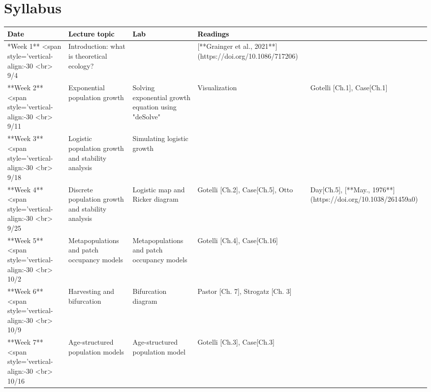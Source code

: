 \documentclass[
]{book}
\begin{document}
\hypertarget{syllabus}{%
\chapter*{Syllabus}\label{syllabus}}

\begingroup\fontsize{17}{19}\selectfont

\begin{tabu} to 
\hline
\begingroup\fontsize{20}{22}\selectfont \textcolor{black}{\textbf{Date}}\endgroup & \begingroup\fontsize{20}{22}\selectfont \textcolor{black}{\textbf{Lecture topic}}\endgroup & \begingroup\fontsize{20}{22}\selectfont \textcolor{black}{\textbf{Lab}}\endgroup & \begingroup\fontsize{20}{22}\selectfont \textcolor{black}{\textbf{Readings}}\endgroup\\
\hline
**Week 1** <span style='vertical-align:-30%
           <br> 9/4 & Introduction: what is theoretical ecology? & \- & [**Grainger et al., 2021**](https://doi.org/10.1086/717206)\\
\hline
**Week 2** <span style='vertical-align:-30%
           <br> 9/11 & Exponential population growth & Solving exponential growth equation using "deSolve" & Visualization & Gotelli [Ch.1], Case[Ch.1]\\
\hline
**Week 3** <span style='vertical-align:-30%
           <br> 9/18 & Logistic population growth and stability analysis & Simulating logistic growth & \-\\
\hline
**Week 4** <span style='vertical-align:-30%
           <br> 9/25 & Discrete population growth and stability analysis & Logistic map and Ricker diagram & Gotelli [Ch.2], Case[Ch.5], Otto & Day[Ch.5],
               [**May., 1976**](https://doi.org/10.1038/261459a0)\\
\hline
**Week 5** <span style='vertical-align:-30%
           <br> 10/2 & Metapopulations and patch occupancy models & Metapopulations and patch occupancy models & Gotelli [Ch.4], Case[Ch.16]\\
\hline
**Week 6** <span style='vertical-align:-30%
           <br> 10/9 & Harvesting and bifurcation & Bifurcation diagram & Pastor [Ch. 7], Strogatz [Ch. 3]\\
\hline
**Week 7** <span style='vertical-align:-30%
           <br> 10/16 & Age-structured population models & Age-structured population model & Gotelli [Ch.3], Case[Ch.3]\\

\end{tabu}
\end{document}
